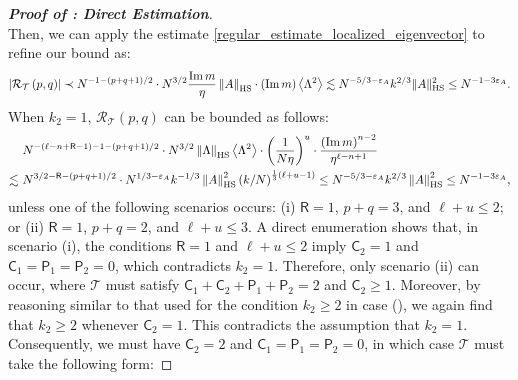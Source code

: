 \documentclass[10pt,reqno]{amsart}
\numberwithin{equation}{section}
\numberwithin{figure}{section}
\newcommand{\rmnum}[1]{\uppercase\expandafter{\romannumeral #1}}
\theoremstyle{plain} %
\theoremstyle{definition} %
\renewcommand{\txt}[1]{\text{\rm{#1}}}
\newcommand{\cor}{\color{darkred}}
\newcommand{\cT}{\mathcal T}
\newcommand{\cR}{{\mathcal R}}
\newcommand{\sR}{\mathsf R}
\newcommand{\sC}{\mathsf C}
\newcommand{\sP}{\mathsf P}
\renewcommand{\leq}{\le}
\renewcommand{\geq}{\ge}
\newcommand{\pa}[1]{\left({#1}\right)}
\newcommand{\absa}[1]{\left\lvert #1 \right\rvert}
\newcommand{\norm}[1]{\lVert #1 \rVert}
\newcommand{\norma}[1]{\left\lVert #1 \right\rVert}
\newcommand{\avga}[1]{\left\langle #1 \right\rangle}
\DeclareMathOperator{\im}{\mathrm{Im}}
\newcommand{\HS}{\txt{HS}}
\newcommand{\mm}{\ell}
\numberwithin{equation}{section}
\begin{document}
\begin{proof}[\bf Proof of : Direct Estimation]
\begin{equation}
         \end{equation}
        Then, we can apply the estimate \eqref{regular_estimate_localized_eigenvector} to refine our bound as: 
         \begin{equation}\nonumber
             \begin{aligned}
                 \absa{\cR_{\cT}\pa{p,q}}\prec N^{-1 -\pa{p+q+1}/2}\cdot N^{3/2}\frac{\im m}{\eta}\norma{A}_{\HS}\cdot (\im m)\avga{\Lambda^2}\lesssim N^{-5/3-\varepsilon_A}k^{2/3}\norm{A}_{\HS}^2\leq N^{-1-3\varepsilon_A}.
             \end{aligned}
         \end{equation}
         When $k_2=1$, $\cR_\cT\pa{p,q}$ can be bounded as follows: 
         \begin{equation}\nonumber
             \begin{aligned}
                 & ~N^{-\pa{\mm-n+\sR-1}-1-\pa{p+q+1}/2}\cdot N^{3/2}\norma{\Lambda}_{\HS}\avga{\Lambda^2}\cdot \pa{\frac{1}{N\eta}}^{u}\cdot \frac{\pa{\im m}^{n-2}}{\eta^{\mm-n+1}}\\
                 \lesssim &~N^{3/2-\sR-\pa{p+q+1}/2}\cdot N^{1/3-\varepsilon_A}k^{-1/3}\norma{A}_{\HS}^2\pa{k/N}^{\frac 1 3 (\mm+u-1)}\leq N^{-5/3-\varepsilon_A}k^{2/3}\norma{A}_{\HS}^2\leq N^{-1-3\varepsilon_A},
             \end{aligned}
         \end{equation}
         unless one of the following scenarios occurs: (i) $\sR=1$, $p+q=3$, and $\mm+u\leq 2$; or (ii) $\sR=1$, $p+q=2$, and $\mm+u\leq 3$. A direct enumeration shows that, in scenario (i), the conditions $\sR=1$ and $\mm+u\leq 2$ imply $\sC_2=1$ and $\sC_1=\sP_1=\sP_2=0$, which contradicts $k_2=1$. Therefore, only scenario (ii) can occur, where $\cT$ must satisfy $\sC_1+\sC_2+\sP_1+\sP_2=2$ and $\sC_2\geq 1$. 
         Moreover, by reasoning similar to that used for the condition $k_2 \geq 2$ in case (\rmnum{3}), we again find that $k_2 \geq 2$ whenever $\sC_2 = 1$. This contradicts the assumption that $k_2 = 1$. Consequently, we must have $\sC_2 = 2$ and $\sC_1 = \sP_1 = \sP_2 = 0$, in which case $\cT$ must take the following form:

\end{proof}
\end{document}
